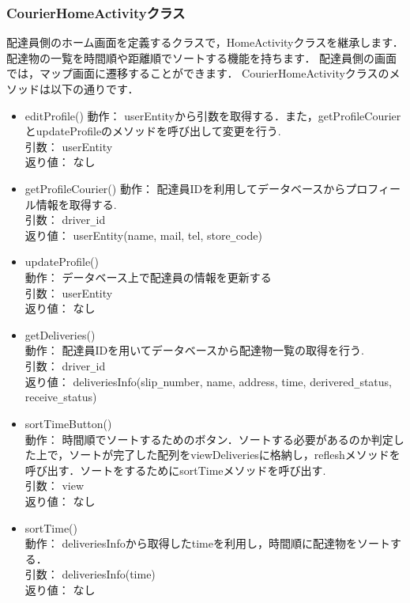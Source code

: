 \documentclass[a4j,titlepage]{jarticle}
\begin{document}
\subsubsection{CourierHomeActivityクラス}
配達員側のホーム画面を定義するクラスで，HomeActivityクラスを継承します．
配達物の一覧を時間順や距離順でソートする機能を持ちます．
配達員側の画面では，マップ画面に遷移することができます．
CourierHomeActivityクラスのメソッドは以下の通りです．
\begin{itemize}
  \item editProfile()
  動作：  userEntityから引数を取得する．また，getProfileCourierとupdateProfileのメソッドを呼び出して変更を行う.\\
  引数：  userEntity\\
  返り値：  なし

  \item getProfileCourier()
  動作：  配達員IDを利用してデータベースからプロフィール情報を取得する.\\
  引数：  driver\verb|_|id\\
  返り値：  userEntity(name, mail, tel, store\verb|_|code)

  \item updateProfile()\\
  動作：  データベース上で配達員の情報を更新する\\
  引数：  userEntity\\
  返り値：  なし

  \item getDeliveries()\\
  動作：  配達員IDを用いてデータベースから配達物一覧の取得を行う.\\
  引数：  driver\verb|_|id\\
  返り値：  deliveriesInfo(slip\verb|_|number, name, address, time, derivered\verb|_|status, receive\verb|_|status)

  \item sortTimeButton()\\
  動作：  時間順でソートするためのボタン．ソートする必要があるのか判定した上で，ソートが完了した配列をviewDeliveriesに格納し，refleshメソッドを呼び出す．ソートをするためにsortTimeメソッドを呼び出す.\\
  引数：  view\\
  返り値：  なし

  \item sortTime()\\
  動作：  deliveriesInfoから取得したtimeを利用し，時間順に配達物をソートする．\\
  引数：  deliveriesInfo(time)\\
  返り値：  なし


\end{itemize}
\end{document}
